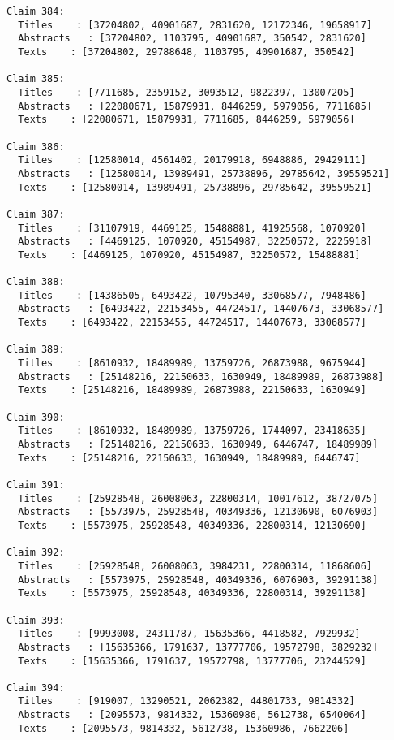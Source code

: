 \documentclass[11pt]{article}
\begin{document}
\begin{Verbatim}[commandchars=\\\{\}]
Claim 384:
  Titles    : [37204802, 40901687, 2831620, 12172346, 19658917]
  Abstracts   : [37204802, 1103795, 40901687, 350542, 2831620]
  Texts    : [37204802, 29788648, 1103795, 40901687, 350542]

Claim 385:
  Titles    : [7711685, 2359152, 3093512, 9822397, 13007205]
  Abstracts   : [22080671, 15879931, 8446259, 5979056, 7711685]
  Texts    : [22080671, 15879931, 7711685, 8446259, 5979056]

Claim 386:
  Titles    : [12580014, 4561402, 20179918, 6948886, 29429111]
  Abstracts   : [12580014, 13989491, 25738896, 29785642, 39559521]
  Texts    : [12580014, 13989491, 25738896, 29785642, 39559521]

Claim 387:
  Titles    : [31107919, 4469125, 15488881, 41925568, 1070920]
  Abstracts   : [4469125, 1070920, 45154987, 32250572, 2225918]
  Texts    : [4469125, 1070920, 45154987, 32250572, 15488881]

Claim 388:
  Titles    : [14386505, 6493422, 10795340, 33068577, 7948486]
  Abstracts   : [6493422, 22153455, 44724517, 14407673, 33068577]
  Texts    : [6493422, 22153455, 44724517, 14407673, 33068577]

Claim 389:
  Titles    : [8610932, 18489989, 13759726, 26873988, 9675944]
  Abstracts   : [25148216, 22150633, 1630949, 18489989, 26873988]
  Texts    : [25148216, 18489989, 26873988, 22150633, 1630949]

Claim 390:
  Titles    : [8610932, 18489989, 13759726, 1744097, 23418635]
  Abstracts   : [25148216, 22150633, 1630949, 6446747, 18489989]
  Texts    : [25148216, 22150633, 1630949, 18489989, 6446747]

Claim 391:
  Titles    : [25928548, 26008063, 22800314, 10017612, 38727075]
  Abstracts   : [5573975, 25928548, 40349336, 12130690, 6076903]
  Texts    : [5573975, 25928548, 40349336, 22800314, 12130690]

Claim 392:
  Titles    : [25928548, 26008063, 3984231, 22800314, 11868606]
  Abstracts   : [5573975, 25928548, 40349336, 6076903, 39291138]
  Texts    : [5573975, 25928548, 40349336, 22800314, 39291138]

Claim 393:
  Titles    : [9993008, 24311787, 15635366, 4418582, 7929932]
  Abstracts   : [15635366, 1791637, 13777706, 19572798, 3829232]
  Texts    : [15635366, 1791637, 19572798, 13777706, 23244529]

Claim 394:
  Titles    : [919007, 13290521, 2062382, 44801733, 9814332]
  Abstracts   : [2095573, 9814332, 15360986, 5612738, 6540064]
  Texts    : [2095573, 9814332, 5612738, 15360986, 7662206]


\end{Verbatim}
\end{document}
